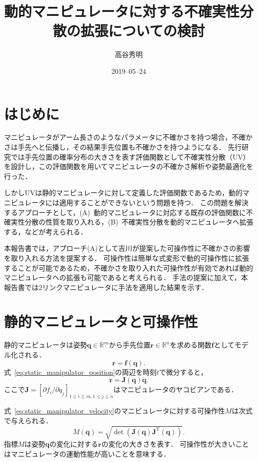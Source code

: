 \documentclass[10pt,a4j,twocolumn]{ltjsarticle}
\title{動的マニピュレータに対する不確実性分散の拡張についての検討} %
\author{高谷秀明}                              %
\date{2019--05--24}                              %
\begin{document}
\maketitle

\section{はじめに}

マニピュレータがアーム長さのようなパラメータに不確かさを持つ場合，不確かさは手先へと伝播し，その結果手先位置も不確かさを持つようになる．
先行研究では手先位置の確率分布の大きさを表す評価関数として不確実性分散（UV）を設計し，この評価関数を用いてマニピュレータの不確かさ解析や姿勢最適化を行った．

しかしUVは静的マニピュレータに対して定義した評価関数であるため，動的マニピュレータには適用することができないという問題を持つ．
この問題を解決するアプローチとして，(A)~動的マニピュレータに対応する既存の評価関数に不確実性分散の性質を取り入れる，(B)~不確実性分散を動的マニピュレータへ拡張する，などが考えられる．

本報告書では，アプローチ(A)として吉川が提案した可操作性に不確かさの影響を取り入れる方法を提案する．
可操作性は簡単な式変形で動的可操作性に拡張することが可能であるため，不確かさを取り入れた可操作性が有効であれば動的マニピュレータへの拡張も可能であると考えられる．
手法の提案に加えて，本報告書では2リンクマニピュレータに手法を適用した結果を示す．

\section{静的マニピュレータと可操作性}

静的マニピュレータは姿勢$\bm{q} \in \mathbb{R}^{m}$から手先位置$\bm{r} \in \mathbb{R}^{n}$を求める関数$\bm{f}$としてモデル化される．
\begin{equation}
  \bm{r} = \bm{f}(\bm{q}). \label{eq:static_manipulator_position}
\end{equation}
式~\eqref{eq:static_manipulator_position}の両辺を時刻$t$で微分すると，
\begin{equation}
  \dot{\bm{r}} = \bm{J}(\bm{q}) \dot{\bm{q}}. \label{eq:static_manipulator_velocity}
\end{equation}
ここで$\bm{J} = [\partial f_{i} / \partial q_{j}]_{1 \leq i \leq m, 1 \leq j \leq n}$はマニピュレータのヤコビアンである．

式~\eqref{eq:static_manipulator_velocity}のマニピュレータに対する可操作性$M$は次式で与えられる．
\begin{equation}
  M(\bm{q}) = \sqrt{\det \left( \bm{J}(\bm{q}) \bm{J}^{\mathrm{T}}(\bm{q}) \right)}.
\end{equation}
指標$M$は姿勢$\bm{q}$の変化に対する$\bm{r}$の変化の大きさを表す．
可操作性が大きいことはマニピュレータの運動性能が高いことを意味する．
\end{document}
